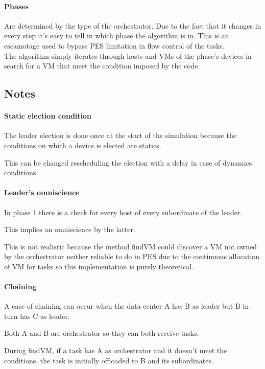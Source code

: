 \documentclass[12pt]{report}
\begin{document}
\paragraph{Phases}
Are determined by the type of the orchestrator.
Due to the fact that it changes in every step it's easy to tell in which phase the algorithm is in.
This is an escamotage used to bypass PES limitation in flow control of the tasks.\\

The algorithm simply iterates through hosts and VMs of the phase's devices in search for a VM that meet the condition imposed by the code.

\subsection{Notes}

\paragraph{Static election condition} The leader election is done once at the start of the simulation because the conditions on which a device is elected are statics.

This can be changed rescheduling the election with a delay in case of dynamics conditions.

\paragraph{Leader's omniscience}
In phase 1 there is a check for every host of every subordinate of the leader.

This implies an omniscience by the latter.

This is not realistic because the method findVM could discover a VM not owned by the orchestrator neither reliable to do in PES due to the continuous allocation of VM for tasks so this implementation is purely theoretical.

\paragraph{Chaining}
A case of chaining can occur when the data center A has B as leader but B in turn has C as leader.

Both A and B are orchestrator so they can both receive tasks.

During findVM, if a task has A as orchestrator and it doesn't meet the conditions, the task is initially offloaded to B and its subordinates.
\end{document}
